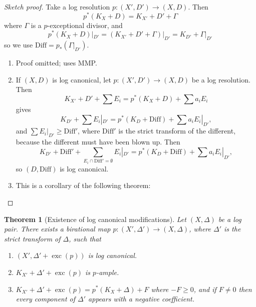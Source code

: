 \documentclass{article}
\newtheorem*{theorem}{Theorem}
\theoremstyle{definition}
\DeclareMathOperator{\exc}{exc}
\newcommand{\Diff}{\mathrm{Diff}}
\begin{document}
\begin{proof}[Sketch proof]
    Take a log resolution $p:(X',D')\to(X,D)$. Then
    \begin{equation*}
        p^*(K_X+D) = K_{X'}+D'+\Gamma
    \end{equation*}
    where $\Gamma$ is a $p$-exceptional divisor, and
    \begin{equation*}
        p^*(K_X+D)|_{D'} = (K_{X'}+D'+\Gamma)|_{D'} = K_{D'} + \Gamma|_{D'}
    \end{equation*}
    so we use $\Diff=p_*(\Gamma|_{D'})$.
    \begin{enumerate}
        \item Proof omitted; uses MMP.

        \item If $(X,D)$ is log canonical, let $p:(X',D')\to(X,D)$ be a log
            resolution. Then
            \begin{equation*}
                K_{X'} + D' + \sum E_i = p^*(K_X+D) + \sum a_iE_i
            \end{equation*}
            gives
            \begin{equation*}
                K_{D'} + \sum E_i|_{D'} = p^*(K_D+\Diff) + \sum a_iE_i|_{D'},
            \end{equation*}
            and $\sum E_i|_{D'}\ge\Diff'$, where $\Diff'$ is the strict
            transform of the different, because the different must have been
            blown up. Then
            \begin{equation*}
                K_{D'} + \Diff'
                    + \sum_{E_i\cap\Diff'=\emptyset}E_i|_{D'}
                    = p^*(K_D+\Diff) + \sum a_iE_i|_{D'},
            \end{equation*}
            so $(D,\Diff)$ is log canonical.

        \item This is a corollary of the following theorem:
    \end{enumerate}
\end{proof}

\begin{theorem}[Existence of log canonical modifications]
    Let $(X,\Delta)$ be a log pair. There exists a birational map
    $p:(X',\Delta')\to(X,\Delta)$, where $\Delta'$ is the strict transform of
    $\Delta$, such that
    \begin{enumerate}
        \item $(X',\Delta'+\exc(p))$ is log canonical.
        \item $K_{X'}+\Delta'+\exc(p)$ is $p$-ample.
        \item $K_{X'}+\Delta'+\exc(p)=p^*(K_X+\Delta)+F$ where $-F\ge0$, and if
            $F\ne0$ then every component of $\Delta'$ appears with a negative
            coefficient.
    \end{enumerate}
\end{theorem}
\end{document}
